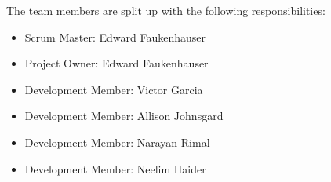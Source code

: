\begin{flushleft}
The team members are split up with the following responsibilities:
\end{flushleft}
\begin{itemize}
	\item Scrum Master: Edward Faukenhauser
	\item Project Owner: Edward Faukenhauser
	\item Development Member: Victor Garcia
	\item Development Member: Allison Johnsgard
	\item Development Member: Narayan Rimal
	\item Development Member: Neelim Haider
\end{itemize}
